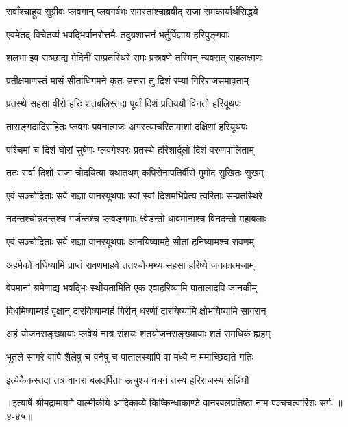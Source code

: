 
\twolineshloka
{सर्वांश्चाहूय सुग्रीवः प्लवगान् प्लवगर्षभः}
{समस्तांश्चाब्रवीद् राजा रामकार्यार्थसिद्धये} %

\twolineshloka
{एवमेतद् विचेतव्यं भवद्भिर्वानरोत्तमैः}
{तदुग्रशासनं भर्तुर्विज्ञाय हरिपुङ्गवाः} %

\twolineshloka
{शलभा इव सञ्छाद्य मेदिनीं सम्प्रतस्थिरे}
{रामः प्रस्रवणे तस्मिन् न्यवसत् सहलक्ष्मणः} %

\twolineshloka
{प्रतीक्षमाणस्तं मासं सीताधिगमने कृतः}
{उत्तरां तु दिशं रम्यां गिरिराजसमावृताम्} %

\twolineshloka
{प्रतस्थे सहसा वीरो हरिः शतबलिस्तदा}
{पूर्वां दिशं प्रतिययौ विनतो हरियूथपः} %

\twolineshloka
{ताराङ्गदादिसहितः प्लवगः पवनात्मजः}
{अगस्त्याचरितामाशां दक्षिणां हरियूथपः} %

\twolineshloka
{पश्चिमां च दिशं घोरां सुषेणः प्लवगेश्वरः}
{प्रतस्थे हरिशार्दूलो दिशं वरुणपालिताम्} %

\twolineshloka
{ततः सर्वा दिशो राजा चोदयित्वा यथातथम्}
{कपिसेनापतिर्वीरो मुमोद सुखितः सुखम्} %

\twolineshloka
{एवं सञ्चोदिताः सर्वे राज्ञा वानरयूथपाः}
{स्वां स्वां दिशमभिप्रेत्य त्वरिताः सम्प्रतस्थिरे} %

\twolineshloka
{नदन्तश्चोन्नदन्तश्च गर्जन्तश्च प्लवङ्गमाः}
{क्ष्वेडन्तो धावमानाश्च विनदन्तो महाबलाः} %

\twolineshloka
{एवं सञ्चोदिताः सर्वे राज्ञा वानरयूथपाः}
{आनयिष्यामहे सीतां हनिष्यामश्च रावणम्} %

\twolineshloka
{अहमेको वधिष्यामि प्राप्तं रावणमाहवे}
{ततश्चोन्मथ्य सहसा हरिष्ये जनकात्मजाम्} %

\twolineshloka
{वेपमानां श्रमेणाद्य भवद्भिः स्थीयतामिति}
{एक एवाहरिष्यामि पातालादपि जानकीम्} %

\twolineshloka
{विधमिष्याम्यहं वृक्षान् दारयिष्याम्यहं गिरीन्}
{धरणीं दारयिष्यामि क्षोभयिष्यामि सागरान्} %

\twolineshloka
{अहं योजनसङ्ख्यायाः प्लवेयं नात्र संशयः}
{शतयोजनसङ्ख्यायाः शतं समधिकं ह्यहम्} %

\twolineshloka
{भूतले सागरे वापि शैलेषु च वनेषु च}
{पातालस्यापि वा मध्ये न ममाच्छिद्यते गतिः} %

\twolineshloka
{इत्येकैकस्तदा तत्र वानरा बलदर्पिताः}
{ऊचुश्च वचनं तस्य हरिराजस्य सन्निधौ} %


॥इत्यार्षे श्रीमद्रामायणे वाल्मीकीये आदिकाव्ये किष्किन्धाकाण्डे वानरबलप्रतिष्ठा नाम पञ्चचत्वारिंशः सर्गः ॥४-४५॥

